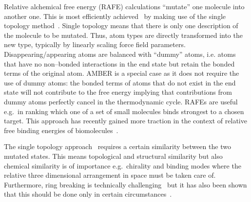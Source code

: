 \documentclass[journal=jctcce,manuscript=article]{achemso}
\begin{document}
Relative alchemical free energy (RAFE) calculations ``mutate'' one
molecule into another one.  This is most efficiently
achieved~\cite{doi:10.1021/j100056a020, Michel2010} by making use of
the single topology method~\cite{doi:10.1063/1.449208,
  doi:10.1021/j100056a020, doi:10.1021/jp981628n}.  Single topology
means that there is only one description of the molecule to be
mutated.  Thus, atom types are directly transformed into the new type,
typically by linearly scaling force field parameters.
Disappearing/appearing atoms are balanced with ``dummy'' atoms,
i.e. atoms that have no non--bonded interactions in the end state but
retain the bonded terms of the original atom.  AMBER is a special case
as it does not require the use of dummy atoms: the bonded terms of
atoms that do not exist in the end state will not contribute to the
free energy implying that contributions from dummy atoms perfectly
cancel in the thermodynamic cycle.  RAFEs are useful e.g.\ in ranking
which one of a set of small molecules binds strongest to a chosen
target.  This approach has recently gained more traction in the
context of relative free binding energies of
biomolecules~\cite{doi:10.1021/ja512751q}.

The single topology approach~\cite{doi:10.1021/j100056a020} requires a
certain similarity between the two mutated states.  This means
topological and structural similarity but also chemical similarity is
of importance e.g.\ chirality and binding modes where the relative
three dimensional arrangement in space must be taken care of.
Furthermore, ring breaking is technically
challenging~\cite{doi:10.1021/acs.jctc.6b00991} but it has also been
shown that this should be done only in certain
circumstances~\cite{doi:10.1021/acs.jcim.5b00057,
  doi:10.1021/jp994193s}.
\end{document}
